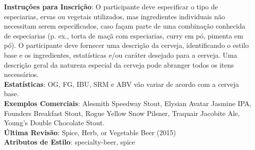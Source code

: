 \textbf{Instruções para Inscrição}: O participante deve especificar o tipo de especiarias, ervas ou vegetais utilizados, mas ingredientes individuais não necessitam serem especificados, caso façam parte de uma combinação conhecida de especiarias (p. ex., torta de maçã com especiarias, curry em pó, pimenta em pó). O participante deve fornecer uma descrição da cerveja, identificando o estilo base e os ingredientes, estatísticas e/ou caráter desejado para a cerveja. Uma descrição geral da natureza especial da cerveja pode abranger todos os itens necessários.\\
\textbf{Estatísticas}: OG, FG, IBU, SRM e ABV vão variar de acordo com a cerveja base.\\
\textbf{Exemplos Comerciais}: Alesmith Speedway Stout, Elysian Avatar Jasmine IPA, Founders Breakfast Stout, Rogue Yellow Snow Pilsner, Traquair Jacobite Ale, Young's Double Chocolate Stout.\\
\textbf{Última Revisão}: Spice, Herb, or Vegetable Beer (2015)\\
\textbf{Atributos de Estilo}: specialty-beer, spice
